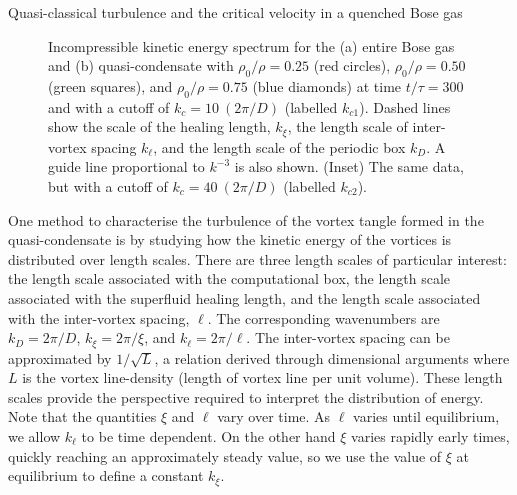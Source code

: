 \begin{chapter}{\label{cha:nonequib}Quasi-classical turbulence and the critical velocity in a quenched Bose gas}
\begin{figure}
{\begin{minipage}{1.1\textwidth}
 \end{minipage}
  }
  \caption{\label{fig:spectra}Incompressible kinetic energy spectrum for the (a) entire Bose gas and (b) quasi-condensate with $\rho_0/\rho=0.25$ (red circles), $\rho_0/\rho=0.50$ (green squares), and $\rho_0/\rho=0.75$ (blue diamonds) at time $t/\tau=300$ and with a cutoff of $k_{c}=10~(2\pi/D)$ (labelled $k_{c1}$). Dashed lines show the scale of the healing length, $k_\xi$, the length scale of inter-vortex spacing $k_\ell$, and the length scale of the periodic box $k_D$. A guide line proportional to $k^{-3}$ is also shown. (Inset) The same data, but with a cutoff of $k_{c}=40~(2\pi/D)$ (labelled $k_{c2}$).}
\end{figure}
One method to characterise the turbulence of the vortex tangle formed in the quasi-condensate is by studying how the kinetic energy of the vortices is distributed over length scales. There are three length scales of particular interest: the length scale associated with the computational box, the length scale associated with the superfluid healing length, and the length scale associated with the inter-vortex spacing, $\ell$. The corresponding wavenumbers are $k_D=2\pi/D$, $k_\xi = 2\pi/\xi$, and $k_\ell = 2\pi/\ell$. The inter-vortex spacing can be approximated by $1/\sqrt{L}$, a relation derived through dimensional arguments where $L$ is the vortex line-density (length of vortex line per unit volume). These length scales provide the perspective required to interpret the distribution of energy. Note that the quantities $\xi$ and $\ell$ vary over time. As $\ell$ varies until equilibrium, we allow $k_\ell$ to be time dependent. On the other hand $\xi$ varies rapidly early times, quickly reaching an approximately steady value, so we use the value of $\xi$ at equilibrium to define a constant $k_\xi$.


\end{chapter}
